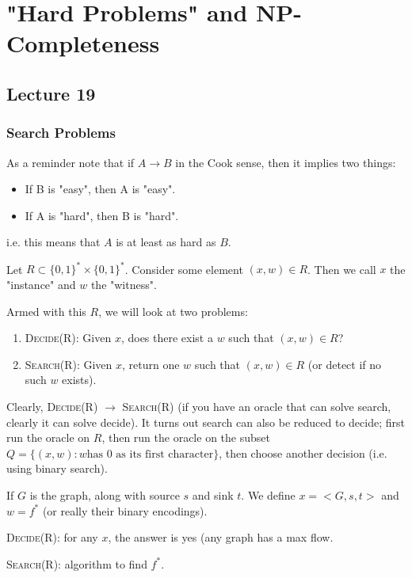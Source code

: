 \section{"Hard Problems" and NP-Completeness}
\subsection{Lecture 19}
\subsubsection{Search Problems}

As a reminder note that if $A \to B$ in the Cook sense,
then it implies two things:
\begin{itemize}
    \item If B is "easy", then A is "easy".
    \item If A is "hard", then B is "hard".
\end{itemize}
i.e. this means that $A$ is at least as hard as $B$.

Let $R \subset \{0, 1\}^* \times \{0, 1\}^*$. Consider some element
$(x, w) \in R$. Then we call $x$ the "instance" and $w$ the "witness".   

Armed with this $R$, we will look at two problems:
\begin{enumerate}
    \item \textsc{Decide(R)}: Given $x$, does there exist a $w$ such that $(x, w) \in R$?
    \item \textsc{Search(R)}: Given $x$, return one $w$ such that $(x, w) \in R$ (or detect if no such $w$ exists).
\end{enumerate}

Clearly, \textsc{Decide(R)} $\to$ \textsc{Search(R)} (if you have an oracle
that can solve search, clearly it can solve decide). It turns out search can also be reduced to decide;
first run the oracle on $R$, then run the oracle on the subset $Q = \{ (x, w) : w \text{has 0 as its first character} \}$, then choose another decision
(i.e. using binary search).

\begin{example}
    If $G$ is the graph, along with source $s$ and sink $t$. 
    We define $x = <G, s, t>$ and $w = f^*$ (or really their binary encodings).

    \textsc{Decide(R)}: for any $x$, the answer is yes (any graph has a max flow.

    \textsc{Search(R)}: algorithm to find $f^*$.
\end{example}


